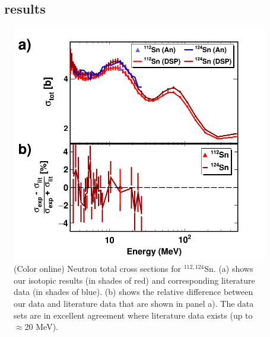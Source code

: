 \subsection{\snTwelveFour\ \tot\ results}
\begin{figure}
    \includegraphics[scale=0.35]{figures/TwoPanelSn.png}
    \caption{(Color online) Neutron total cross sections for $^{112,124}$Sn.
        (a) shows our isotopic results (in shades of red) and
        corresponding literature data \cite{Harper1982, Rapaport1980, Dukarevich1967} (in
        shades of blue). (b) shows the relative difference between our data
        and literature data that are shown in panel a). The data sets are in
    excellent agreement where literature data exists (up to $\approx$20 MeV).}
    \label{TwoPanelSn}
\end{figure}


